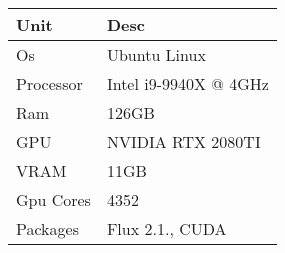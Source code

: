 \begin{table}[h]
\centering
\begin{tabular}{|l|l|}
\hline
\textbf{Unit} & \textbf{Desc}         \\ \hline
Os            & Ubuntu Linux          \\ \hline
Processor     & Intel i9-9940X @ 4GHz \\ \hline
Ram           & 126GB                 \\ \hline
GPU           & NVIDIA RTX 2080TI     \\ \hline
VRAM          & 11GB                  \\ \hline
Gpu Cores     & 4352                  \\ \hline
Packages      & Flux 2.1., CUDA       \\ \hline
\end{tabular}
\label{tab:specs}
\end{table}